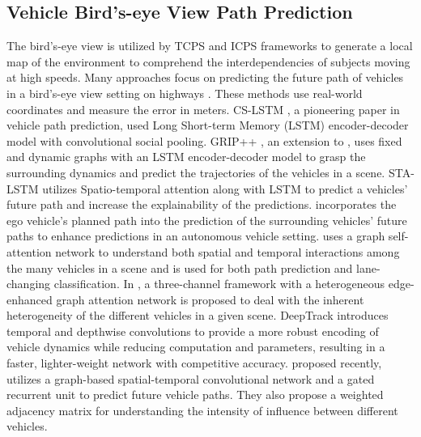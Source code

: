 \documentclass[sigconf]{acmart}
\begin{document}
\subsection{Vehicle Bird's-eye View Path Prediction}
The bird's-eye view is utilized by TCPS \cite{chwa2018closing, katariya2021deeptrack} and ICPS \cite{lian2020cyber} frameworks to generate a local map of the environment to comprehend the interdependencies of subjects moving at high speeds. Many approaches focus on predicting the future path of vehicles in a bird's-eye view setting on highways \cite{GSTCN2022, STALSTM2021, 2020gripplus}. These methods use real-world coordinates and measure the error in meters. CS-LSTM \cite{CSlstm18}, a pioneering paper in vehicle path prediction, used Long Short-term Memory (LSTM) encoder-decoder model with convolutional social pooling. GRIP++ \cite{2020gripplus}, an extension to \cite{grip2019}, uses fixed and dynamic graphs with an LSTM encoder-decoder model to grasp the surrounding dynamics and predict the trajectories of the vehicles in a scene. STA-LSTM \cite{STALSTM2021} utilizes Spatio-temporal attention along with LSTM to predict a vehicles' future path and increase the explainability of the predictions. \cite{Pip2021} incorporates the ego vehicle's planned path into the prediction of the surrounding vehicles' future paths to enhance predictions in an autonomous vehicle setting. \cite{GSAN} uses a graph self-attention network to understand both spatial and temporal interactions among the many vehicles in a scene and is used for both path prediction and lane-changing classification. In \cite{HEAT}, a three-channel framework with a heterogeneous edge-enhanced graph attention network is proposed to deal with the inherent heterogeneity of the different vehicles in a given scene. DeepTrack \cite{katariya2021deeptrack} introduces temporal and depthwise convolutions to provide a more robust encoding of vehicle dynamics while reducing computation and parameters, resulting in a faster, lighter-weight network with competitive accuracy. \cite{GSTCN2022} proposed recently, utilizes a graph-based spatial-temporal convolutional network and a gated recurrent unit to predict future vehicle paths. They also propose a weighted adjacency matrix for understanding the intensity of influence between different vehicles.
\end{document}
